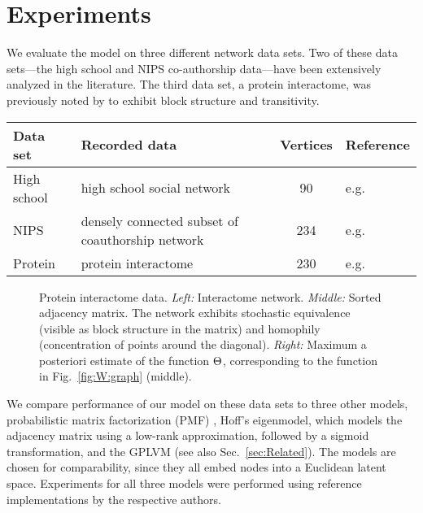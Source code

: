 
\section{Experiments}

We evaluate the model on three different network data sets. Two of these data sets---the high school and NIPS co-authorship data---have been extensively
analyzed in the literature. The third data set, a protein interactome, was previously noted by \citet{Hoff2007a}
 to exhibit block structure and transitivity.

\begin{center}
  \begin{tabular}{l  l  c  l}
    Data set & Recorded data & Vertices & Reference\\
    \midrule
    High school & high school social network & 90 & e.g.\ \cite{Hoff2007a} \\
    NIPS & densely connected subset of coauthorship network & 234 & e.g.\ \cite{Miller2009} \\
    Protein & protein interactome & 230 & e.g.\ \cite{Hoff2007a}\\
  \end{tabular}
\end{center}

\begin{figure}[]
  \centering
  
  \vspace{-0.5cm}
  \caption{Protein interactome data. 
    \emph{Left:} Interactome network. 
    \emph{Middle:} Sorted adjacency matrix. The network exhibits stochastic equivalence 
    (visible as block structure in the matrix) and homophily (concentration of points around the diagonal). 
    \emph{Right:} Maximum a posteriori estimate of the function $\Theta$, corresponding to the function in Fig.~\ref{fig:W:graph} (middle).
  }
  \label{fig:(R)GPLVM_Comparison}
\end{figure}


We compare performance of our model on these data sets to three other models, probabilistic matrix factorization (PMF) \cite{Salakhutdinov2008},
Hoff's eigenmodel, which models the adjacency matrix using a low-rank approximation, followed by a sigmoid transformation, and the GPLVM (see also Sec.~\ref{sec:Related}). The models are chosen for comparability, since they all embed nodes into a Euclidean latent space.
Experiments for all three models were performed using reference implementations by the respective 
authors.\footnotemark

